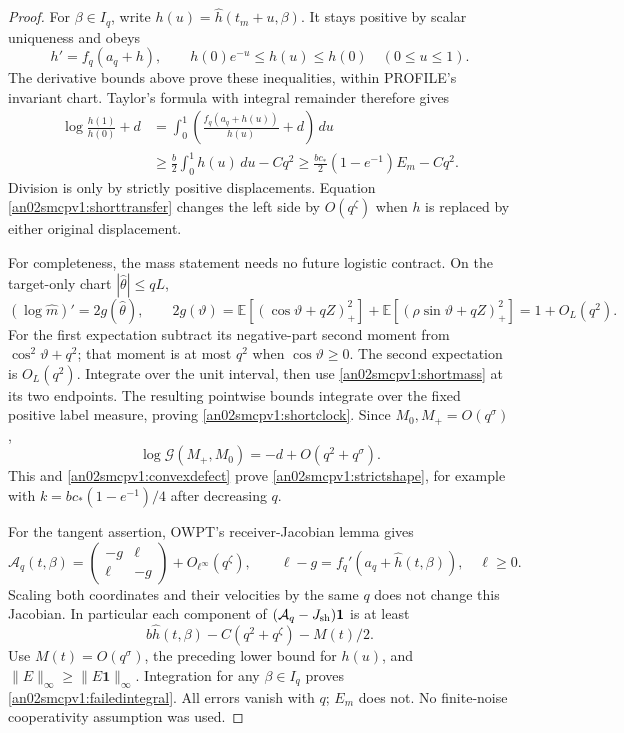 \documentclass[11pt]{article}
\theoremstyle{remark}\newtheorem{remark}[theorem]{Remark}
\newcommand{\dd}{\,d}
\newcommand{\E}{\mathbb E}
\newcommand{\ones}{\boldsymbol 1}
\begin{document}
\begin{proof}
For $\beta\in I_q$, write $h(u)=\widehat h(t_m+u,\beta)$.
It stays positive by scalar uniqueness and obeys
\[
 h'=f_q(a_q+h),\qquad h(0)e^{-u}\le h(u)\le h(0)
 \quad(0\le u\le1).
\]
The derivative bounds above prove these inequalities, within
PROFILE's invariant chart. Taylor's formula with integral remainder
therefore gives
\begin{align}
 \log\frac{h(1)}{h(0)}+d
 &=\int_0^1\left(\frac{f_q(a_q+h(u))}{h(u)}+d\right)\dd u
 \nonumber\\
 &\ge\frac b2\int_0^1h(u)\dd u-Cq^2
 \ge\frac{bc_*}{2}(1-e^{-1})E_m-Cq^2.
 \label{an02smcpv1:convexdefect}
\end{align}
Division is only by strictly positive displacements. Equation
\eqref{an02smcpv1:shorttransfer} changes the left side by
$O(q^\zeta)$ when $h$ is replaced by either original displacement.

For completeness, the mass statement needs no future logistic
contract. On the target-only chart $|\widehat\theta|\le qL$,
\[
 (\log\widehat m)'=2g(\widehat\theta),\qquad
 2g(\vartheta)=
 \E[(\cos\vartheta+qZ)_+^2]
 +\E[(\rho\sin\vartheta+qZ)_+^2]=1+O_L(q^2).
\]
For the first expectation subtract its negative-part second
moment from $\cos^2\vartheta+q^2$; that moment is at most $q^2$
when $\cos\vartheta\ge0$. The second expectation is $O_L(q^2)$.
Integrate over the unit interval, then use
\eqref{an02smcpv1:shortmass} at its two endpoints. The resulting
pointwise bounds integrate over the fixed positive label measure,
proving \eqref{an02smcpv1:shortclock}. Since $M_0,M_+=O(q^\sigma)$,
\[
 \log\mathcal G(M_+,M_0)=-d+O(q^2+q^\sigma).
\]
This and \eqref{an02smcpv1:convexdefect} prove
\eqref{an02smcpv1:strictshape}, for example with
$k=bc_*(1-e^{-1})/4$ after decreasing $q$.

For the tangent assertion, OWPT's receiver-Jacobian lemma gives
\[
 \mathcal A_q(t,\beta)=
 \begin{pmatrix}-g&\ell\\\ell&-g\end{pmatrix}
 +O_{\ell^\infty}(q^\zeta),\qquad
 \ell-g=f_q'(a_q+\widehat h(t,\beta)),\quad \ell\ge0.
\]
Scaling both coordinates and their velocities by the same $q$
does not change this Jacobian. In particular each component of
$(\mathcal A_q-J_{\rm sh})\ones$ is at least
\[
 b\widehat h(t,\beta)-C(q^2+q^\zeta)-M(t)/2.
\]
Use $M(t)=O(q^\sigma)$, the preceding lower bound for $h(u)$,
and $\|E\|_\infty\ge\|E\ones\|_\infty$.
Integration for any $\beta\in I_q$ proves
\eqref{an02smcpv1:failedintegral}. All errors vanish with $q$;
$E_m$ does not. No finite-noise cooperativity assumption was used.
\end{proof}
\end{document}
